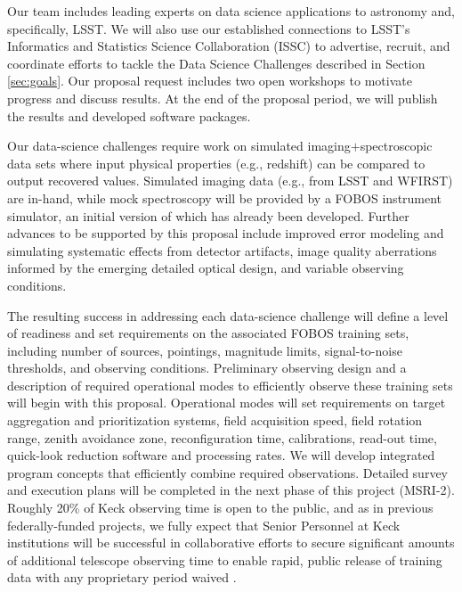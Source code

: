 \documentclass[oneside,11pt]{amsart}
\begin{document}
Our team includes leading experts on data science applications to
astronomy and, specifically, LSST.  We will also use our established
connections to LSST's Informatics and Statistics Science Collaboration
(ISSC) to advertise, recruit, and coordinate efforts to tackle the Data
Science Challenges described in Section \ref{sec:goals}.  Our proposal
request includes two open workshops to motivate progress and discuss
results. At the end of the proposal period, we will publish the results
and developed software packages.

Our data-science challenges require work on simulated
imaging$+$spectroscopic data sets where input physical properties (e.g.,
redshift) can be compared to output recovered values.  Simulated imaging
data (e.g., from LSST and WFIRST) are in-hand, while mock spectroscopy
will be provided by a FOBOS instrument simulator, an initial version of
which has already been developed.  Further advances to be supported by
this proposal include improved error modeling and simulating systematic
effects from detector artifacts, image quality aberrations informed by
the emerging detailed optical design, and variable observing conditions.

The resulting success in addressing each data-science challenge will
define a level of readiness and set requirements on the associated FOBOS
training sets, including number of sources, pointings, magnitude limits,
signal-to-noise thresholds, and observing conditions.  Preliminary
observing design and a description of required operational modes to
efficiently observe these training sets will begin with this proposal.
Operational modes will set requirements on target aggregation and
prioritization systems, field acquisition speed, field rotation range,
zenith avoidance zone, reconfiguration time, calibrations, read-out
time, quick-look reduction software and processing rates.  We will
develop integrated program concepts that efficiently combine required
observations.  Detailed survey and execution plans will be completed in
the next phase of this project (MSRI-2).  Roughly 20\% of Keck observing
time is open to the public, and as in previous federally-funded
projects, we fully expect that Senior Personnel at Keck institutions
will be successful in collaborative efforts to secure significant
amounts of additional telescope observing time to enable rapid, public
release of training data with any proprietary period waived
\citep[e.g.,][]{newman13}.

\end{document}
